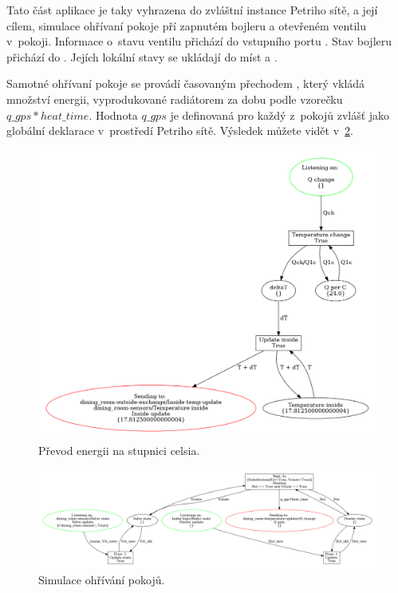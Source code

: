 Tato část aplikace je taky vyhrazena do zvláštní instance Petriho sítě, a její cílem, simulace ohřívaní pokoje pří zapnutém bojleru a otevřeném ventilu v~pokoji. Informace o~stavu ventilu přichází do vstupního portu . Stav bojleru přichází do . Jejích lokální stavy se ukládají do míst  a .

Samotné ohřívaní pokoje se provádí časovaným přechodem , který vkládá množství energii, vyprodukované radiátorem za dobu  podle vzorečku $q\_gps * heat\_time$. Hodnota $q\_gps$ je definovaná pro každý z~pokojů zvlášť jako globální deklarace v~prostředí Petriho sítě. Výsledek  můžete vidět v~\ref{heater-viz}.

\begin{figure}[htb]
 \centering
 \includegraphics[width=\textwidth]{obrazky-figures/room-temp-upd.png}
 \caption{Převod energii na stupnici celsia.}
 \label{room-temp-viz}
\end{figure}

\begin{figure}[htb]
 \centering
 \includegraphics[width=\textwidth]{obrazky-figures/room-heating.png}
 \caption{Simulace ohřívání pokojů.}
 \label{heater-viz}
\end{figure}

